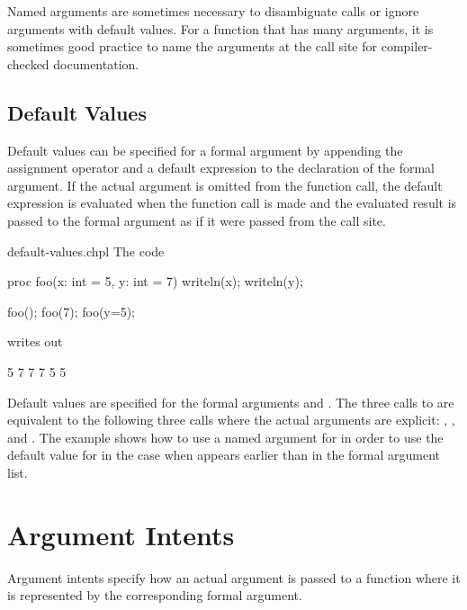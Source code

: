 Named arguments are sometimes necessary to disambiguate calls or
ignore arguments with default values.  For a function that has many
arguments, it is sometimes good practice to name the arguments at the
call site for compiler-checked documentation.

\subsection{Default Values}
\label{Default_Values}

Default values can be specified for a formal argument by appending the
assignment operator and a default expression to the declaration of the
formal argument.  If the actual argument is omitted from the function
call, the default expression is evaluated when the function call is
made and the evaluated result is passed to the formal argument as if
it were passed from the call site.

\begin{chapelexample}{default-values.chpl}
The code
\begin{chapel}
proc foo(x: int = 5, y: int = 7) { writeln(x); writeln(y); }

foo();
foo(7);
foo(y=5);
\end{chapel}
writes out
\begin{chapelprintoutput}{}
5
7
7
7
5
5
\end{chapelprintoutput}
Default values are specified for the formal arguments 
and .  The three calls to  are equivalent to the
following three calls where the actual arguments are
explicit: , , and .
The example  shows how to use a named argument
for  in order to use the default value for  in the
case when  appears earlier than  in the formal
argument list.
\end{chapelexample}


\section{Argument Intents}
\label{Argument_Intents}

Argument intents specify how an actual argument is passed to a
function where it is represented by the corresponding formal argument.

